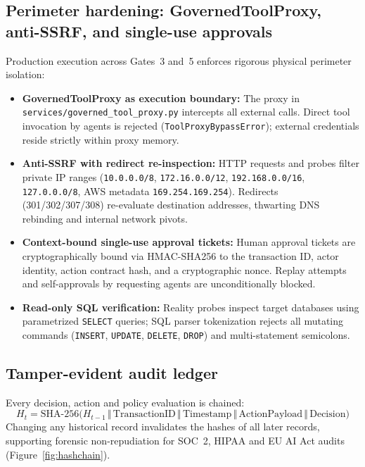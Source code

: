 \documentclass[11pt,a4paper]{article}
\newcommand{\fp}[1]{\texttt{\scriptsize #1}}
\begin{document}
\subsection{Perimeter hardening: GovernedToolProxy, anti-SSRF, and single-use approvals}
Production execution across Gates~3 and~5 enforces rigorous physical perimeter isolation:
\begin{itemize}[leftmargin=*,itemsep=1pt]
  \item \textbf{GovernedToolProxy as execution boundary:} The proxy in \fp{services/governed\_tool\_proxy.py} intercepts all external calls. Direct tool invocation by agents is rejected (\texttt{ToolProxyBypassError}); external credentials reside strictly within proxy memory.
  \item \textbf{Anti-SSRF with redirect re-inspection:} HTTP requests and probes filter private IP ranges (\texttt{10.0.0.0/8}, \texttt{172.16.0.0/12}, \texttt{192.168.0.0/16}, \texttt{127.0.0.0/8}, AWS metadata \texttt{169.254.169.254}). Redirects (301/302/307/308) re-evaluate destination addresses, thwarting DNS rebinding and internal network pivots.
  \item \textbf{Context-bound single-use approval tickets:} Human approval tickets are cryptographically bound via HMAC-SHA256 to the transaction ID, actor identity, action contract hash, and a cryptographic nonce. Replay attempts and self-approvals by requesting agents are unconditionally blocked.
  \item \textbf{Read-only SQL verification:} Reality probes inspect target databases using parametrized \texttt{SELECT} queries; SQL parser tokenization rejects all mutating commands (\texttt{INSERT}, \texttt{UPDATE}, \texttt{DELETE}, \texttt{DROP}) and multi-statement semicolons.
\end{itemize}

\subsection{Tamper-evident audit ledger}
Every decision, action and policy evaluation is chained:
\begin{equation}
H_t=\mathrm{SHA\text{-}256}\big(H_{t-1}\,\Vert\,\text{TransactionID}\,\Vert\,\text{Timestamp}\,\Vert\,\text{ActionPayload}\,\Vert\,\text{Decision}\big)
\end{equation}
Changing any historical record invalidates the hashes of all later records, supporting forensic non-repudiation for SOC~2, HIPAA and EU AI Act audits (Figure~\ref{fig:hashchain}).
\end{document}
